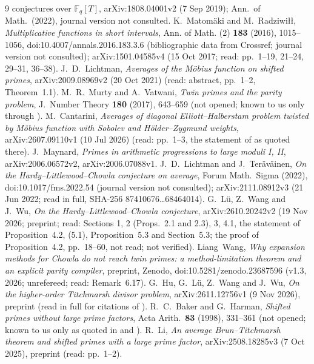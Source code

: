 \documentclass[11pt]{amsart}
\theoremstyle{definition}
\theoremstyle{remark}
\begin{document}
\begin{thebibliography}{9}
{  conjectures over $\mathbb F_q[T]$}, arXiv:1808.04001v2 (7 Sep 2019); Ann.\ of
  Math.\ (2022), journal version not consulted.
 K.~Matom\"aki and M.~Radziwi\l\l, \emph{Multiplicative functions in short intervals}, Ann. of Math. (2) \textbf{183} (2016), 1015--1056, doi:10.4007/annals.2016.183.3.6 (bibliographic data from Crossref; journal version not consulted); arXiv:1501.04585v4 (15 Oct 2017; read: pp.~1--19, 21--24, 29--31, 36--38).
 J.~D.~Lichtman, \emph{Averages of the M\"obius function on
  shifted primes}, arXiv:2009.08969v2 (20 Oct 2021) (read: abstract,
  pp.~1--2, Theorem~1.1).
 M.~R.~Murty and A.~Vatwani, \emph{Twin primes and the parity
  problem}, J.\ Number Theory \textbf{180} (2017), 643--659 (not opened; known to
  us only through \cite{Can26}).
 M.~Cantarini, \emph{Averages of diagonal Elliott--Halberstam problem twisted by
  M\"obius function with Sobolev and H\"older--Zygmund weights},
  arXiv:2607.09110v1 (10 Jul 2026) (read: pp.~1--3, the statement of
  \cite[Theorem~1.1]{MV17} as quoted there).
 J.~Maynard, \emph{Primes in arithmetic progressions to large
  moduli I, II}, arXiv:2006.06572v2, arXiv:2006.07088v1.
 J.~D.~Lichtman and J.~Ter\"av\"ainen, \emph{On the Hardy--Littlewood--Chowla conjecture on average}, Forum Math.\ Sigma (2022), doi:10.1017/fms.2022.54 (journal version not consulted); arXiv:2111.08912v3 (21 Jun 2022; read in full, SHA-256 87410676\ldots68464014).
 G.~L\"u, Z.~Wang and J.~Wu, \emph{On the Hardy--Littlewood--Chowla conjecture},
  arXiv:2610.20242v2 (19 Nov 2026; preprint; read: Sections 1, 2 (Props.~2.1 and 2.3),
  3, 4.1, the statement of Proposition~4.2, (5.1), Proposition~5.3 and Section~5.3; the
  proof of Proposition~4.2, pp.~18--60, not read; not verified).
 Liang~Wang, \emph{Why expansion methods for Chowla do not reach twin primes: a method-limitation theorem and an explicit parity compiler}, preprint, Zenodo, doi:10.5281/zenodo.23687596 (v1.3, 2026; unrefereed; read: Remark~6.17).
 G.~Hu, G.~L\"u, Z.~Wang and J.~Wu, \emph{On the higher-order Titchmarsh divisor problem}, arXiv:2611.12756v1 (9 Nov 2026), preprint (read in full for citations of \cite{LWW26}).
 R.~C.~Baker and G.~Harman, \emph{Shifted primes without large prime factors}, Acta Arith.\ \textbf{83} (1998), 331--361 (not opened; known to us only as quoted in \cite{Li25} and \cite{Din25}).
 R.~Li, \emph{An average Brun--Titchmarsh theorem and shifted primes with a large prime factor}, arXiv:2508.18285v3 (7 Oct 2025), preprint (read: pp.~1--2).

\end{thebibliography}
\end{document}
